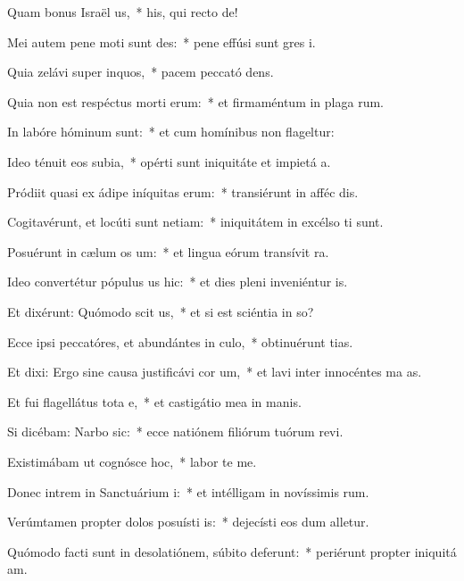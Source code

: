 \item Quam bonus Israël us,~* his, qui recto  de!
\item Mei autem pene moti sunt des:~* pene effúsi sunt gres i.
\item Quia zelávi super inquos,~* pacem peccató dens.
\item Quia non est respéctus morti erum:~* et firmaméntum in plaga rum.
\item In labóre hóminum  sunt:~* et cum homínibus non flageltur:
\item Ideo ténuit eos subia,~* opérti sunt iniquitáte et impietá a.
\item Pródiit quasi ex ádipe iníquitas erum:~* transiérunt in afféc dis.
\item Cogitavérunt, et locúti sunt netiam:~* iniquitátem in excélso ti sunt.
\item Posuérunt in cælum os um:~* et lingua eórum transívit  ra.
\item Ideo convertétur pópulus us hic:~* et dies pleni inveniéntur  is.
\item Et dixérunt: Quómodo scit us,~* et si est sciéntia in so?
\item Ecce ipsi peccatóres, et abundántes in culo,~* obtinuérunt tias.
\item Et dixi: Ergo sine causa justificávi cor um,~* et lavi inter innocéntes ma as.
\item Et fui flagellátus tota e,~* et castigátio mea in manis.
\item Si dicébam: Narbo sic:~* ecce natiónem filiórum tuórum revi.
\item Existimábam ut cognósce hoc,~* labor  te me.
\item Donec intrem in Sanctuárium i:~* et intélligam in novíssimis rum.
\item Verúmtamen propter dolos posuísti is:~* dejecísti eos dum alletur.
\item Quómodo facti sunt in desolatiónem, súbito deferunt:~* periérunt propter iniquitá am.
